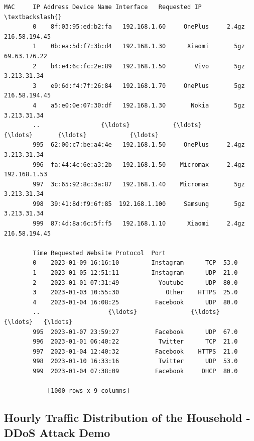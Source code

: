 \documentclass[11pt]{article}
\makeatletter
\newcommand{\boxspacing}{\kern\kvtcb@left@rule\kern\kvtcb@boxsep}
\newcommand{\prompt}[4]{
    {\ttfamily\llap{{\color{#2}[#3]:\hspace{3pt}#4}}\vspace{-\baselineskip}}
}
\makeatother
\begin{document}
\begin{tcolorbox}[breakable, size=fbox, boxrule=.5pt, pad at break*=1mm, opacityfill=0]
    \prompt{Out}{outcolor}{37}{\boxspacing}
    \begin{Verbatim}[commandchars=\\\{\}]
        MAC     IP Address Device Name Interface   Requested IP  \textbackslash{}
        0    8f:03:95:ed:b2:fa   192.168.1.60     OnePlus     2.4gz  216.58.194.45
        1    0b:ea:5d:f7:3b:d4   192.168.1.30      Xiaomi       5gz   69.63.176.22
        2    b4:e4:6c:fc:2e:89   192.168.1.50        Vivo       5gz    3.213.31.34
        3    e9:6d:f4:7f:26:84   192.168.1.70     OnePlus       5gz  216.58.194.45
        4    a5:e0:0e:07:30:df   192.168.1.30       Nokia       5gz    3.213.31.34
        ..                 {\ldots}            {\ldots}         {\ldots}       {\ldots}            {\ldots}
        995  62:00:c7:be:a4:4e   192.168.1.50     OnePlus     2.4gz    3.213.31.34
        996  fa:44:4c:6e:a3:2b   192.168.1.50    Micromax     2.4gz   192.168.1.53
        997  3c:65:92:8c:3a:87   192.168.1.40    Micromax       5gz    3.213.31.34
        998  39:41:8d:f9:6f:85  192.168.1.100     Samsung       5gz    3.213.31.34
        999  87:4d:8a:6c:5f:f5   192.168.1.10      Xiaomi     2.4gz  216.58.194.45

        Time Requested Website Protocol  Port
        0    2023-01-09 16:16:10         Instagram      TCP  53.0
        1    2023-01-05 12:51:11         Instagram      UDP  21.0
        2    2023-01-01 07:31:49           Youtube      UDP  80.0
        3    2023-01-03 10:55:30             Other    HTTPS  25.0
        4    2023-01-04 16:08:25          Facebook      UDP  80.0
        ..                   {\ldots}               {\ldots}      {\ldots}   {\ldots}
        995  2023-01-07 23:59:27          Facebook      UDP  67.0
        996  2023-01-01 06:40:22           Twitter      TCP  21.0
        997  2023-01-04 12:40:32          Facebook    HTTPS  21.0
        998  2023-01-10 16:33:16           Twitter      UDP  53.0
        999  2023-01-04 07:38:09          Facebook     DHCP  80.0

            [1000 rows x 9 columns]
    \end{Verbatim}
\end{tcolorbox}

\hypertarget{hourly-traffic-distribution-of-the-household---ddos-attack-demo}{%
    \subsection{Hourly Traffic Distribution of the Household - DDoS Attack
        Demo}\label{hourly-traffic-distribution-of-the-household---ddos-attack-demo}}
\end{document}
